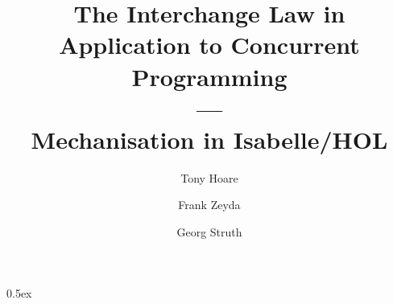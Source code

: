 \documentclass[11pt,a4paper]{article}
\begin{document}
\title{The Interchange Law in Application to Concurrent Programming\\---\\Mechanisation in Isabelle/HOL}

\author{Tony Hoare \and Frank Zeyda \and Georg Struth}



\maketitle


\begin{abstract}
\end{abstract}


\tableofcontents
\newpage

\parindent 0pt\parskip 0.5ex




\newpage


\newpage




%
%

\end{document}
